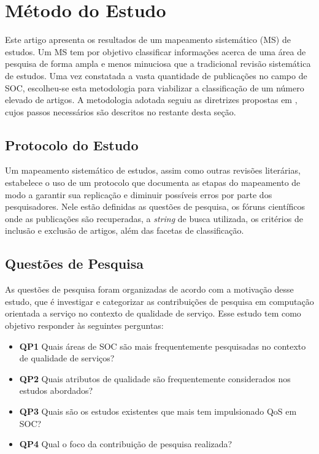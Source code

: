 
\section{Método do Estudo}\label{sec:review_method}

Este artigo apresenta os resultados de um mapeamento sistemático (MS) de estudos. Um MS tem por objetivo classificar informações acerca de uma área de pesquisa de forma ampla e menos minuciosa que a tradicional revisão sistemática de estudos. Uma vez constatada a vasta quantidade de publicações no campo de SOC, escolheu-se esta metodologia para viabilizar a classifica\c c\~{a}o de um número elevado de artigos. A metodologia adotada seguiu as diretrizes propostas em \cite{petersen:sms2008}, cujos passos necess\'{a}rios s\~{a}o descritos no restante desta se\c c\~{a}o.

\subsection{Protocolo do Estudo}

Um mapeamento sistemático de estudos, assim como outras revisões literárias, estabelece o uso de um protocolo que documenta as etapas do mapeamento de modo a garantir sua replicação e diminuir possíveis erros por parte dos pesquisadores. Nele estão definidas as questões de pesquisa, os fóruns científicos onde as publicações s\~{a}o recuperadas, a \textit{string} de busca utilizada, os critérios de inclusão e exclusão de artigos, além das facetas de classificação.

\subsection{Quest\~{o}es de Pesquisa}\label{sec:questoesPesquisa}

As questões de pesquisa foram organizadas de acordo com a motivação desse estudo, que é investigar e categorizar as contribuições de pesquisa em computação orientada a serviço no contexto de qualidade de serviço. Esse estudo tem como objetivo responder às seguintes perguntas: 

\begin{itemize}

\item {\bf QP1} Quais áreas de SOC são mais frequentemente pesquisadas no contexto de qualidade de serviços?
\item {\bf QP2} Quais atributos de qualidade são frequentemente considerados nos estudos abordados? 
\item {\bf QP3} Quais s\~{a}o os estudos existentes que mais tem impulsionado QoS em SOC?
\item {\bf QP4} Qual o foco da contribuição de pesquisa realizada?   
\end{itemize}

